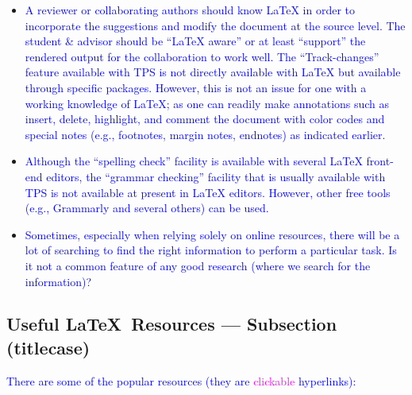 \documentclass[phd,showframe]{ndsu-thesis-2022}
\newcommand\italk[1]{\textcolor{blue}{#1}}  %
\newcommand\lx{\LaTeX\xspace}
\begin{document}
\begin{itemize}[leftmargin=*, itemsep=0pt, parsep=3pt]
\item \italk{A reviewer or collaborating authors should know \lx in order to incorporate the suggestions and modify the document at the source level. The student \& advisor should be ``\lx aware'' or at least ``support'' the rendered output for the collaboration to work well.  The ``Track-changes'' feature available with TPS is not directly available with \lx but available through specific packages. However, this is not an issue for one with a working knowledge of \lx; as one can readily make annotations such as insert, delete, highlight, and comment the document with color codes and special notes (e.g., footnotes, margin notes, endnotes) as indicated earlier.} 

\item \italk{Although the ``spelling check'' facility is available with several \lx front-end editors, the ``grammar checking'' facility that is usually available with TPS is not available at present in \lx editors. However, other free tools (e.g., Grammarly and several others) can be used.}  

\item \italk{Sometimes, especially when relying solely on online resources, there will be a lot of searching to find the right information to perform a particular task. Is it not a common feature of any good research (where we search for the information)?} 

\end{itemize}

\subsection{Useful \LaTeX\ Resources --- Subsection (titlecase)} 

\italk{There are some of the popular resources (they are \textcolor{magenta}{clickable} hyperlinks):}
\end{document}
